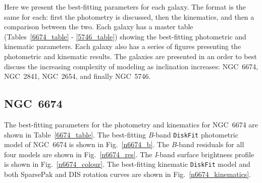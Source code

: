 \documentclass[a4paper,fleqn,usenatbib]{mnras}
\begin{document}
Here we present the best-fitting parameters for each galaxy. The format is the same for each: first the photometry is discussed, then the kinematics, and then a comparison between the two. Each galaxy has a master table (Tables~\ref{6674_table} - \ref{5746_table}) showing the best-fitting photometric and kinematic parameters. Each galaxy also has a series of figures presenting the photometric and kinematic results. The galaxies are presented in an order to best discuss the increasing complexity of modeling as inclination increases: NGC~6674, NGC~2841, NGC~2654, and finally NGC~5746.

\subsection{NGC~6674}
\label{sec:n6674}

The best-fitting parameters for the photometry and kinematics for NGC~6674 are shown in Table~\ref{6674_table}. The best-fitting \textit{B}-band \texttt{DiskFit} photometric model of NGC~6674 is shown in Fig.~\ref{n6674_b}. The \textit{B}-band residuals for all four models are shown in Fig.~\ref{n6674_res}. The \textit{I}-band surface brightness profile is shown in Fig.~\ref{n6674_colour}. The best-fitting kinematic \texttt{DiskFit} model and both SparsePak and DIS rotation curves are shown in Fig.~\ref{n6674_kinematics}.
\end{document}

